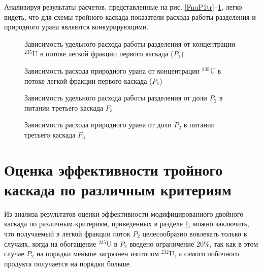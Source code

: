 {Анализируя результаты расчетов, представленные на  рис. \ref{FnuP1tr}--\ref{pFoP1tr}, легко видеть, что для схемы тройного каскада показатели расхода работы разделения и природного урана являются конкурирующими.

\begin{figure}[ht]
    \centering
    \begin{minipage}{.5\textwidth}
        \centering
        
  \caption{{Зависимость удельного расхода работы разделения от концентрации $^{235}$U в потоке легкой фракции первого каскада ($P_1$){\label{FnuP1tr}}}}
  \end{minipage}%
    \begin{minipage}{.5\textwidth}
      \centering
      
\caption{{Зависимость расхода природного урана от концентрации $^{235}$U в потоке легкой фракции первого каскада ($P_1$){\label{pFoP1tr}}}}
    \end{minipage}
\end{figure}

\begin{figure}[ht]
    \centering
    \begin{minipage}{.5\textwidth}
        \centering
        
  \caption{{Зависимость удельного расхода работы разделения от доли $P_2$ в питании третьего каскада $F_3${\label{FnuP1tr2}}}}
  \end{minipage}%
    \begin{minipage}{.5\textwidth}
      \centering
      
\caption{{Зависимость расхода природного урана от доли $P_2$ в питании третьего каскада $F_3${\label{pFoP1tr2}}}}
    \end{minipage}
\end{figure}

\section{Оценка эффективности тройного каскада по различным критериям}\label{MDKefficiency}

Из анализа результатов оценки эффективности модифицированного двойного каскада по различным критериям, приведенных в разделе \ref{MDKefficiency}, можно заключить, что получаемый в легкой фракции поток $P_2$ целесообразно вовлекать только в случаях, когда на обогащение $^{235}$U в $P_2$ введено ограничение 20\%, так как в этом случае $P_2$ на порядки меньше загрязнен изотопом $^{232}$U, а самого побочного продукта получается на порядки больше.

}
